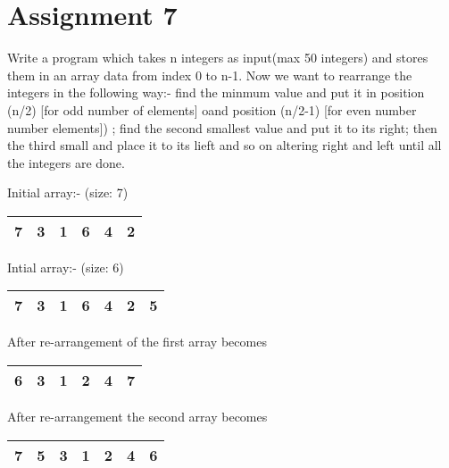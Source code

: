 \section*{\centering Assignment 7}
\vspace{15px}
Write a program which takes n integers as input(max 50 integers)
and stores them in an array data from index 0 to n-1. Now we want to 
rearrange the integers in the following way:- find the minmum
value and put it in position (n/2) [for odd number of elements]
oand position (n/2-1) [for even number number elements]) ;
find the second smallest value and put it to its right;
then the third small and place it to its lieft and so 
on altering right and left until all the integers are done.

Initial array:- (size: 7)
\begin{tabular}{| c | c | c | c | c | c |}
	\hline
	7 & 3 & 1 & 6 & 4 & 2 \\
	\hline
\end{tabular}

Intial array:- (size: 6)
\begin{tabular}{| c | c | c | c | c | c | c |}
	\hline
	7 & 3 & 1 & 6 & 4 & 2 & 5 \\
	\hline
\end{tabular}

After re-arrangement of the first array becomes

\begin{tabular}{| c | c | c | c | c | c |}
	\hline
	6 & 3 & 1 & 2 & 4 & 7 \\
	\hline
\end{tabular}

After re-arrangement the second array becomes

\begin{tabular}{| c | c | c | c | c | c | c |}
	\hline
	7 & 5 & 3 & 1 & 2 & 4 & 6 \\
	\hline
\end{tabular}

